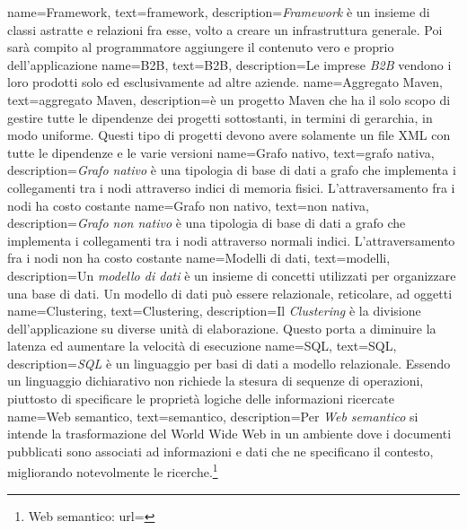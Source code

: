
\renewcommand{\glossaryname}{Glossario}

{
    name=Framework,
    text=framework,
    description={\textit{Framework} è un insieme di classi astratte e relazioni fra esse, volto a creare un infrastruttura generale. Poi sarà compito al programmatore aggiungere il contenuto vero e proprio dell'applicazione}
}
{
    name=B2B,
    text=B2B,
    description={Le imprese \textit{B2B} vendono i loro prodotti solo ed esclusivamente ad altre aziende.}
}
{
    name=Aggregato Maven,
    text=aggregato Maven,
    description={è un progetto Maven che ha il solo scopo di gestire tutte le dipendenze dei progetti sottostanti, in termini di gerarchia, in modo uniforme. Questi tipo di progetti devono avere solamente un file XML con tutte le dipendenze e le varie versioni}
}
{
    name=Grafo nativo,
    text=grafo nativa,
    description={\textit{Grafo nativo} è una tipologia di base di dati a grafo che implementa i collegamenti tra i nodi attraverso indici di memoria fisici. L'attraversamento fra i nodi ha costo costante}
}
{
    name=Grafo non nativo,
    text=non nativa,
    description={\textit{Grafo non nativo} è una tipologia di base di dati a grafo che implementa i collegamenti tra i nodi attraverso normali indici. L'attraversamento fra i nodi non ha costo costante}
}
{
    name=Modelli di dati,
    text=modelli,
    description={Un \textit{modello di dati} è un insieme di concetti utilizzati per organizzare una base di dati. Un modello di dati può essere relazionale, reticolare, ad oggetti}
}
{
    name=Clustering,
    text=Clustering,
    description={Il \textit{Clustering} è la divisione dell'applicazione su diverse unità di elaborazione. Questo porta a diminuire la latenza ed aumentare la velocità di esecuzione}
}
{
    name=SQL,
    text=SQL,
    description={\textit{SQL} è un linguaggio per basi di dati a modello relazionale. Essendo un linguaggio dichiarativo non richiede la stesura di sequenze di operazioni, piuttosto di specificare le proprietà logiche delle informazioni ricercate}
}
{
    name=Web semantico,
    text=semantico,
    description={Per \textit{Web semantico} si intende la trasformazione del World Wide Web in un ambiente dove i documenti pubblicati sono associati ad informazioni e dati che ne specificano il contesto, migliorando notevolmente le ricerche.\footnote{Web semantico: url= }}
}
